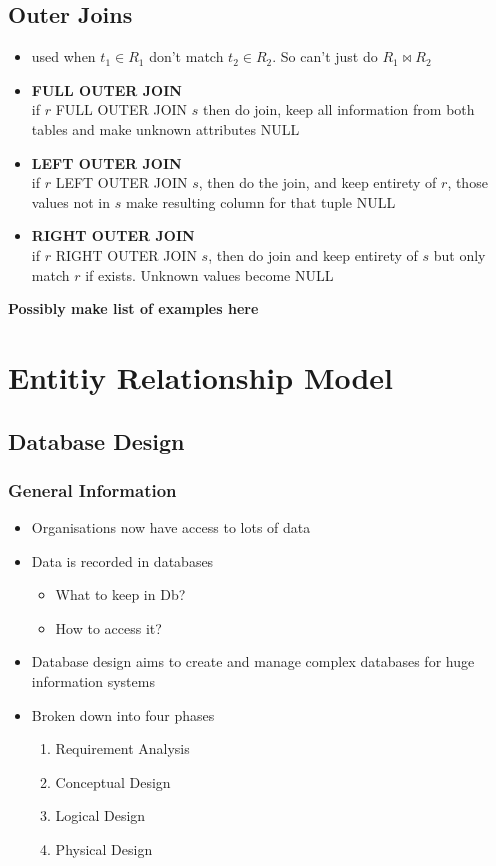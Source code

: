 \documentclass{article}
\newcommand\tab[1][0.5cm]{\hspace*{#1}}
\begin{document}
	\subsection{Outer Joins}
		\begin{itemize}
			\item used when $t_1 \in R_1$ don't match $t_2 \in R_2$. So can't just do $R_1 \bowtie R_2$
			\item \textbf{FULL OUTER JOIN}\\\tab
			if $r$ FULL OUTER JOIN $s$ then do join, keep all information from both tables and make unknown attributes NULL
			\item \textbf{LEFT OUTER JOIN}\\\tab
			if $r$ LEFT OUTER JOIN $s$, then do the join, and keep entirety of $r$, those values not in $s$ make resulting column for that tuple NULL
			\item \textbf{RIGHT OUTER JOIN}\\\tab
			if $r$ RIGHT OUTER JOIN $s$, then do join and keep entirety of $s$ but only match $r$ if exists. Unknown values become NULL
		\end{itemize}


	\textbf{Possibly make list of examples here}

\section{Entitiy Relationship Model}
	\subsection{Database Design}
		\subsubsection{General Information}
			\begin{itemize}
				\item Organisations now have access to lots of data
				\item Data is recorded in databases
					\begin{itemize}
						\item What to keep in Db?
						\item How to access it?
					\end{itemize}
				\item Database design aims to create and manage complex databases for huge information systems
				\item Broken down into four phases
					\begin{enumerate}
						\item Requirement Analysis
						\item Conceptual Design
						\item Logical Design
						\item Physical Design
					\end{enumerate}
			\end{itemize}
\end{document}
